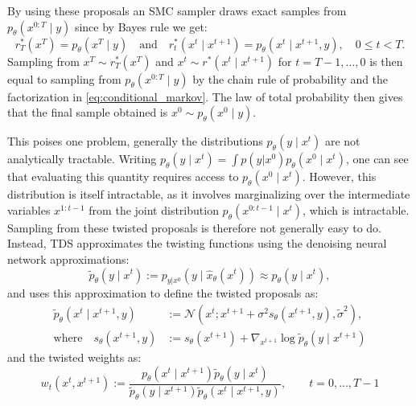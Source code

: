 By using these proposals an SMC sampler draws exact samples from $p_\theta(x^{0:T} \mid y)$ since by Bayes rule we get:
\begin{equation}
r_T^*(x^T) = p_\theta(x^T \mid y)
\quad \text{and} \quad
r_t^*(x^t \mid x^{t+1}) = p_\theta(x^t \mid x^{t+1}, y), \quad 0 \leq t < T.
\label{eq:optimal_twisted_proposals}
\end{equation}
Sampling from $x^T \sim r^*_T(x^T)$ and $x^t \sim r^*(x^t \mid x^{t+1})$ for $t = T-1, \ldots, 0$ is then equal to sampling from $p_\theta(x^{0:T} \mid y)$ by the chain rule of probability and the factorization in \eqref{eq:conditional_markov}. The law of total probability then gives that the final sample obtained is $x^0 \sim p_\theta(x^0 \mid y)$.

This poises one problem, generally the distributions $p_\theta(y \mid x^t)$ are not analytically tractable. Writing $p_\theta(y \mid x^t) = \int p(y | x^0)p_\theta(x^0 \mid x^t)$, one can see that evaluating this quantity requires access to $p_\theta(x^0 \mid x^t)$. However, this distribution is itself intractable, as it involves marginalizing over the intermediate variables $x^{1:t-1}$ from the joint distribution $p_\theta(x^{0:t-1} \mid x^t)$, which is intractable. Sampling from these twisted proposals is therefore not generally easy to do. Instead, TDS approximates the twisting functions using the denoising neural network approximations:
\begin{equation}
	\tilde{p}_\theta(y \mid x^t) := p_{y|x^0}(y \mid \hat{x}_\theta(x^t)) \approx p_\theta(y \mid x^t),
	\label{eq:approx_twisted_func}
\end{equation}
and uses this approximation to define the twisted proposals as:
\begin{align}
\tilde{p}_\theta(x^t \mid x^{t+1}, y) &:= \mathcal{N} \left(x^t; x^{t+1} + \sigma^2 s_\theta(x^{t+1}, y), \tilde{\sigma}^2\right), \label{eq:approx_twisted_proposal}\\
\text{where} \quad s_\theta(x^{t+1}, y) &:= s_\theta(x^{t+1}) + \nabla_{x^{t+1}} \log \tilde{p}_\theta(y \mid x^{t+1})
\label{eq:approx_cond_score}
\end{align}
and the twisted weights as:
\begin{equation}
w_t(x^t, x^{t+1}) := \frac{p_\theta(x^t \mid x^{t+1})\tilde{p}_\theta(y \mid x^t)}{\tilde{p}_\theta(y \mid x^{t+1})\tilde{p}_\theta(x^t \mid x^{t+1}, y)}, \qquad t = 0, \dots, T - 1
\label{eq:approx_twisted_weights}
\end{equation}
